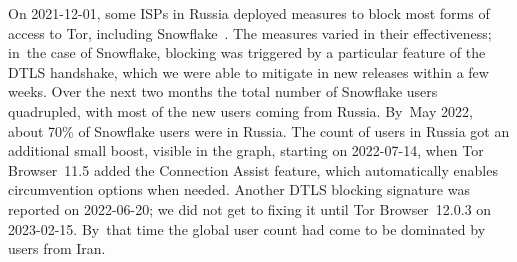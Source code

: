 \documentclass[letterpaper,twocolumn]{article}
\begin{document}
On \mbox{2021-12-01}, some ISPs in Russia
deployed measures to block
most forms of access to Tor,
including Snowflake~\cite{ooni-2021-russia-blocks-tor}.
The measures varied in their effectiveness;
in~the case of Snowflake,
blocking was triggered by a particular feature of the DTLS handshake,
which we were able to mitigate in new releases within a few weeks.
Over the next two months the total number of Snowflake users quadrupled,
with most of the new users coming from Russia.
By~May 2022,
about 70\% of Snowflake users were in Russia.
The count of users in Russia got an additional small boost,
visible in the graph,
starting on \mbox{2022-07-14},
when Tor Browser~11.5 added the Connection Assist feature,
which automatically enables circumvention options when needed.
Another DTLS blocking signature was reported on \mbox{2022-06-20};
we did not get to fixing it until Tor Browser~12.0.3 on \mbox{2023-02-15}.
By~that time the global user count had come to be dominated by users from Iran.
\end{document}

